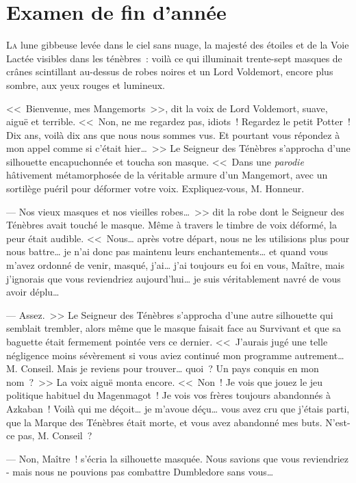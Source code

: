 \chapter{Examen de fin d’année}

\lettrine{L}{a} lune gibbeuse levée dans le ciel sans nuage, la majesté des étoiles et de la Voie Lactée visibles dans les ténèbres~: voilà ce qui illuminait trente-sept masques de crânes scintillant au-dessus de robes noires et un Lord Voldemort, encore plus sombre, aux yeux rouges et lumineux.

<<~Bienvenue, mes Mangemorts~>>, dit la voix de Lord Voldemort, suave, aiguë et terrible. <<~Non, ne me regardez pas, idiots~! Regardez le petit Potter~! Dix ans, voilà dix ans que nous nous sommes vus. Et pourtant vous répondez à mon appel comme si c'était hier…~>> Le Seigneur des Ténèbres s'approcha d'une silhouette encapuchonnée et toucha son masque. <<~Dans une \emph{parodie} hâtivement métamorphosée de la véritable armure d'un Mangemort, avec un sortilège puéril pour déformer votre voix. Expliquez-vous, M. Honneur.

--- Nos vieux masques et nos vieilles robes…~>> dit la robe dont le Seigneur des Ténèbres avait touché le masque. Même à travers le timbre de voix déformé, la peur était audible. <<~Nous… après votre départ, nous ne les utilisions plus pour nous battre… je n'ai donc pas maintenu leurs enchantements… et quand vous m'avez ordonné de venir, masqué, j'ai… j'ai toujours eu foi en vous, Maître, mais j'ignorais que vous reviendriez aujourd'hui… je suis véritablement navré de vous avoir déplu…

--- Assez.~>> Le Seigneur des Ténèbres s'approcha d'une autre silhouette qui semblait trembler, alors même que le masque faisait face au Survivant et que sa baguette était fermement pointée vers ce dernier. <<~J'aurais jugé une telle négligence moins sévèrement si vous aviez continué mon programme autrement… M. Conseil. Mais je reviens pour trouver… quoi~? Un pays conquis en mon nom~?~>> La voix aiguë monta encore. <<~Non~! Je vois que jouez le jeu politique habituel du Magenmagot~! Je vois vos frères toujours abandonnés à Azkaban~! Voilà qui me déçoit… je m'avoue déçu… vous avez cru que j'étais parti, que la Marque des Ténèbres était morte, et vous avez abandonné mes buts. N'est-ce pas, M. Conseil~?

--- Non, Maître~! s'écria la silhouette masquée. Nous savions que vous reviendriez - mais nous ne pouvions pas combattre Dumbledore sans vous…

